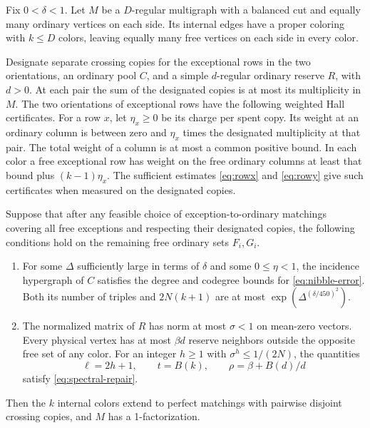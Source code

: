 \begin{theorem}\label{thm:hybrid-completion}
Fix \(0<\delta<1\). Let \(M\) be a \(D\)-regular multigraph with a balanced cut and equally many ordinary vertices on each side. Its internal edges have a proper coloring with \(k\le D\) colors, leaving equally many free vertices on each side in every color.

Designate separate crossing copies for the exceptional rows in the two orientations, an ordinary pool \(C\), and a simple \(d\)-regular ordinary reserve \(R\), with \(d>0\). At each pair the sum of the designated copies is at most its multiplicity in \(M\). The two orientations of exceptional rows have the following weighted Hall certificates. For a row \(x\), let \(\eta_x\ge0\) be its charge per spent copy. Its weight at an ordinary column is between zero and \(\eta_x\) times the designated multiplicity at that pair. The total weight of a column is at most a common positive bound. In each color a free exceptional row has weight on the free ordinary columns at least that bound plus \((k-1)\eta_x\). The sufficient estimates \eqref{eq:rowx} and \eqref{eq:rowy} give such certificates when measured on the designated copies.

Suppose that after any feasible choice of exception-to-ordinary matchings covering all free exceptions and respecting their designated copies, the following conditions hold on the remaining free ordinary sets \(F_i,G_i\).
\begin{enumerate}
\item For some \(\Delta\) sufficiently large in terms of \(\delta\) and some \(0\le\eta<1\), the incidence hypergraph of \(C\) satisfies the degree and codegree bounds for \eqref{eq:nibble-error}. Both its number of triples and \(2N(k+1)\) are at most \(\exp(\Delta^{(\delta/450)^2})\).
\item The normalized matrix of \(R\) has norm at most \(\sigma<1\) on mean-zero vectors. Every physical vertex has at most \(\beta d\) reserve neighbors outside the opposite free set of any color. For an integer \(h\ge1\) with \(\sigma^h\le1/(2N)\), the quantities
\[
 \ell=2h+1,\qquad t=B(k),\qquad \rho=\beta+B(d)/d
\]
satisfy \eqref{eq:spectral-repair}.
\end{enumerate}
Then the \(k\) internal colors extend to perfect matchings with pairwise disjoint crossing copies, and \(M\) has a 1-factorization.
\end{theorem}

